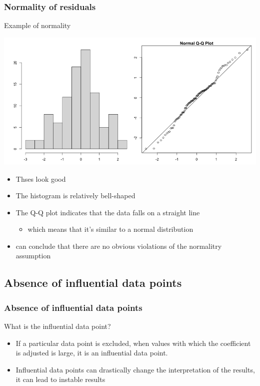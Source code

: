 \documentclass[10p]{beamer}\usepackage[]{graphicx}\usepackage[]{color}
\begin{document}
\begin{frame}
\frametitle{Normality of residuals}
Example of normality
\begin{center}
\includegraphics[scale=.2]{figure/fig3}
\end{center}
\begin{itemize}
\item Thses look good
\item The histogram is relatively bell-shaped
\item The Q-Q plot indicates that the data falls on a straight line
	\begin{itemize}
	\item which means that it's similar to a normal distribution
	\end{itemize}
\item can conclude that there are no obvious violations of the normalitry assumption
\end{itemize}
\end{frame}

\subsection{Absence of influential data points}
\begin{frame}
\frametitle{Absence of influential data points}
What is the influential data point?
\begin{itemize}
\item If a particular data point is excluded, when values with which the coefficient is adjusted is large, it is an influential data point.
\item Influential data points can drastically change the interpretation of the results, it can lead to instable results
\end{itemize}
\end{frame}
\end{document}
